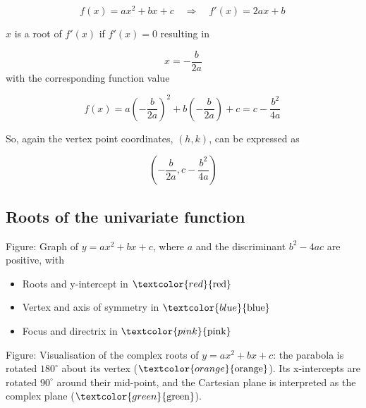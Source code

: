 $$f(x)=ax^2+bx+c \quad \Rightarrow \quad f'(x)=2ax+b \,$$



$x$ is a root of $f'(x)$ if $f'(x)=0$ resulting in



$$x=-\frac{b}{2a}$$ with the corresponding function value



$$f(x) = a \left (-\frac{b}{2a} \right)^2+b \left (-\frac{b}{2a} \right)+c = c-\frac{b^2}{4a} \,$$

So, again the vertex point coordinates, $(h, k)$, can be expressed as



$$\left (-\frac {b}{2a}, c-\frac {b^2}{4a} \right)$$




\subsection{Roots of the univariate function}
\label{sss:root-c66c}







Figure: Graph of $y = ax^2 + bx + c$, where $a$ and the discriminant $b^2 - 4ac$ are positive, with

\begin{itemize}
    \item Roots and y-intercept in $\textcolor{red}{\text{red}}$
    \item Vertex and axis of symmetry in $\textcolor{blue}{\text{blue}}$
    \item Focus and directrix in $\textcolor{pink}{\text{pink}}$
\end{itemize}




Figure: Visualisation of the complex roots of $y = ax^2 + bx + c$: the parabola is rotated
$180^{\circ}$ about its vertex ($\textcolor{orange}{\text{orange}}$). Its x-intercepts are
rotated $90^{\circ}$ around their mid-point, and the Cartesian plane is interpreted as the
complex plane ($\textcolor{green}{\text{green}}$).




